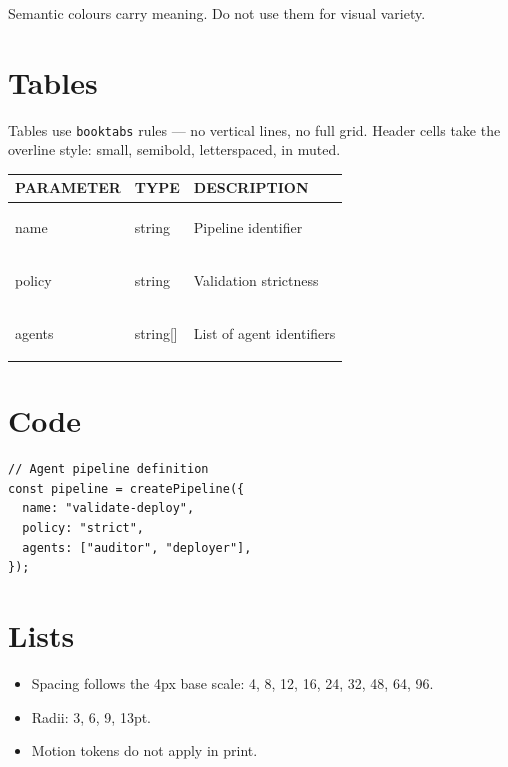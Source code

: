 \documentclass[a4paper,11pt]{article}
\newcommand{\code}[1]{{\ttfamily\colorbox{slate2}{\strut #1}}}
\begin{document}
\begin{brandwarn}[Warning]
Semantic colours carry meaning. Do not use them for visual variety.
\end{brandwarn}

\section{Tables}

Tables use \texttt{booktabs} rules — no vertical lines, no full grid. Header
cells take the overline style: small, semibold, letterspaced, in muted.

\begin{center}
\begin{tabular}{@{}lll@{}}
\toprule
{\sffamily\bfseries\footnotesize\color{muted} PARAMETER} &
{\sffamily\bfseries\footnotesize\color{muted} TYPE} &
{\sffamily\bfseries\footnotesize\color{muted} DESCRIPTION} \\
\midrule
\code{name}   & string   & Pipeline identifier \\
\code{policy} & string   & Validation strictness \\
\code{agents} & string[] & List of agent identifiers \\
\bottomrule
\end{tabular}
\end{center}

\section{Code}

\begin{verbatim}
// Agent pipeline definition
const pipeline = createPipeline({
  name: "validate-deploy",
  policy: "strict",
  agents: ["auditor", "deployer"],
});
\end{verbatim}

\section{Lists}

\begin{itemize}[leftmargin=1.2em, itemsep=2pt]
  \item Spacing follows the 4px base scale: 4, 8, 12, 16, 24, 32, 48, 64, 96.
  \item Radii: 3, 6, 9, 13pt.
  \item Motion tokens do not apply in print.
\end{itemize}
\end{document}
